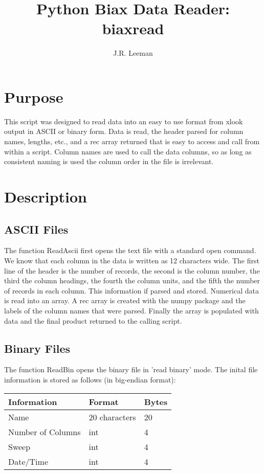 \documentclass[a4paper,11pt,oneside]{article}
\author{ J.R. Leeman}
\title{Python Biax Data Reader: biaxread}
\begin{document}
\maketitle
\newpage

\section{Purpose}
This script was designed to read data into an easy to use format from xlook output in ASCII or binary form.  Data is read, the header parsed for column names, lengths, etc., and a rec array returned that is easy to access and call from within a script.  Column names are used to call the data columns, so as long as consistent naming is used the column order in the file is irrelevant.

\section{Description}
\subsection{ASCII Files}
The function ReadAscii first opens the text file with a standard open command.  We know that each column in the data is written as 12 characters wide.  The first line of the header is the number of records, the second is the column number, the third the column headings, the fourth the column units, and the fifth the number of records in each column.  This information if parsed and stored.  Numerical data is read into an array.  A rec array is created with the numpy package and the labels of the column names that were parsed.  Finally the array is populated with data and the final product returned to the calling script.

\subsection{Binary Files}
The function ReadBin opens the binary file in 'read binary' mode.  The inital file information is stored as follows (in big-endian format):


\begin{table}[h]
	\begin{center}
	\begin{tabular}{| l | l | l |}
		\hline
                  \rowcolor[gray]{.85}
		Information & Format & Bytes\\
		\hline
		Name & 20 characters &  20\\
		\hline
		Number of Columns & int & 4 \\
		\hline
		Sweep & int & 4\\
		\hline
		Date/Time & int & 4\\
		\hline
	\end{tabular}
	\end{center}
	\label{BinaryFileHeadFormat}
\end{table}
\end{document}

